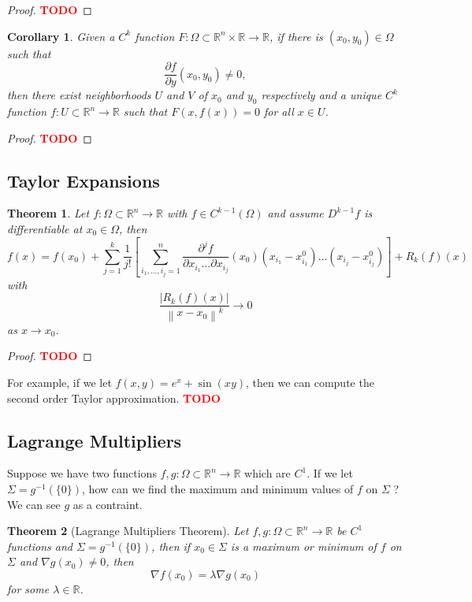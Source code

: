 \documentclass{article}
\theoremstyle{plain}
\newtheorem{theorem}{Theorem}[subsection]
\newtheorem*{corollary}{Corollary}
\theoremstyle{definition}
\newcommand{\R}{\mathbb{R}}
\newcommand{\td}{\textcolor{red}{\textbf{TODO}}}
\newcommand{\norm}[1]{\left\lVert#1 \right\rVert}
\begin{document}
\begin{proof}
    \td 
\end{proof}

\begin{corollary}
    Given a $C^k$ function $F : \Omega \subset \R^n \times \R \to \R$, if there is $(x_0, y_0) \in \Omega$ such that
    $$\frac{\partial f}{\partial y}(x_0, y_0) \neq 0,$$
    then there exist neighborhoods $U$ and $V$ of $x_0$ and $y_0$ respectively and a unique $C^k$ function $f : U \subset \R^n \to \R$ such that $F(x, f(x)) = 0$ for all $x \in U$.
\end{corollary}

\begin{proof}
    \td 
\end{proof}

\subsection{Taylor Expansions}

\begin{theorem}
    Let $f : \Omega \subset \R^n \to \R$ with $f \in C^{k-1}(\Omega)$ and assume $D^{k-1}f$ is differentiable at $x_0 \in \Omega$, then 
    $$f(x) = f(x_0) + \sum_{j=1}^{k}\frac{1}{j!}\left[\sum_{i_1, ..., i_j = 1}^{n}\frac{\partial^j f}{\partial x_{i_1} \dots \partial x_{i_j}}(x_0) (x_{i_1} - x_{i_1}^0)\dots(x_{i_j} - x_{i_j}^0)\right] + R_k(f)(x)$$
    with
    $$\frac{|R_k(f)(x)|}{\norm{x - x_0}^k} \rightarrow 0$$
    as $x \rightarrow x_0$.
\end{theorem}

\begin{proof}
    \td 
\end{proof}

For example, if we let $f(x,y) = e^x+ \sin(xy)$, then we can compute the second order Taylor approximation. \td 

\subsection{Lagrange Multipliers}

Suppose we have two functions $f,g : \Omega\subset\R^n \to \R$ which are $C^1$. If we let $\Sigma = g^{-1}(\{0\})$, how can we find the maximum and minimum values of $f$ on $\Sigma$ ? We can see $g$ as a contraint.

\begin{theorem}[Lagrange Multipliers Theorem]
    Let $f,g : \Omega \subset \R^n \to \R$ be $C^1$ functions and $\Sigma = g^{-1}(\{0\})$, then if $x_0 \in \Sigma$ is a maximum or minimum of $f$ on $\Sigma$ and $\nabla g(x_0) \neq 0$, then 
    $$\nabla f (x_0) = \lambda \nabla g(x_0)$$
    for some $\lambda \in \R$. 
\end{theorem}
\end{document}
